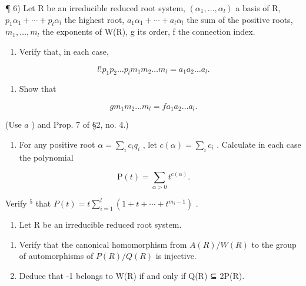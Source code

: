 ¶ 6) Let R be an irreducible reduced root system, \((\alpha_{1},\ldots,\alpha_{l})\) a basis of R, \(p_{1}\alpha_{1}+\cdots+p_{l}\alpha_{l}\) the highest root, \(a_{1}\alpha_{1}+\cdots+a_{l}\alpha_{l}\) the sum of the positive roots, \(m_{1},\ldots,m_{l}\) the exponents of W(R), g its order, f the connection index.

\begin{enumerate}
\def\labelenumi{\alph{enumi})}
\tightlist
\item
  Verify that, in each case,
\end{enumerate}

\[
l! p _ {1} p _ {2} \dots p _ {l} m _ {1} m _ {2} \dots m _ {l} = a _ {1} a _ {2} \dots a _ {l}.
\]

\begin{enumerate}
\def\labelenumi{\alph{enumi})}
\setcounter{enumi}{1}
\tightlist
\item
  Show that
\end{enumerate}

\[
g m _ {1} m _ {2} \dots m _ {l} = f a _ {1} a _ {2} \dots a _ {l}.
\]

(Use \(a\) ) and Prop. 7 of §2, no. 4.)

\begin{enumerate}
\def\labelenumi{\alph{enumi})}
\setcounter{enumi}{2}
\tightlist
\item
  For any positive root \(\alpha = \sum_{i} c_{i} q_{i}\) , let \(c(\alpha) = \sum_{i} c_{i}\) . Calculate in each case the polynomial
\end{enumerate}

\[
\mathrm{P} (t) = \sum_ {\alpha > 0} t ^ {c (\alpha)}.
\]

Verify \(^{5}\) that \(P(t) = t \sum_{i=1}^{l} (1 + t + \cdots + t^{m_{i}-1})\) .

\begin{enumerate}
\def\labelenumi{\arabic{enumi})}
\setcounter{enumi}{6}
\tightlist
\item
  Let R be an irreducible reduced root system.
\end{enumerate}

\begin{enumerate}
\def\labelenumi{\alph{enumi})}
\item
  Verify that the canonical homomorphism from \(A(R)/W(R)\) to the group of automorphisms of \(P(R)/Q(R)\) is injective.
\item
  Deduce that -1 belongs to W(R) if and only if Q(R) ⊆ 2P(R).
\end{enumerate}

